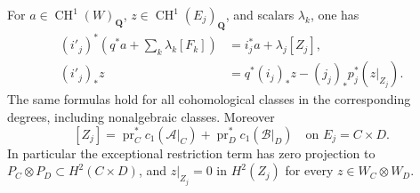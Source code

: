 \begin{lemma}
\label{r22dw:actualmaps}
For $a\in\operatorname{CH}^1(W)_{\mathbf Q}$,
$z\in\operatorname{CH}^1(E_j)_{\mathbf Q}$, and scalars $\lambda_k$,
one has
\[
\begin{aligned}
 (i'_j)^*\left(q^*a+\sum_k\lambda_k[F_k]\right)
       &=i_j^*a+\lambda_j[Z_j],\\
 (i'_j)_*z&=q^*(i_j)_*z-(j_j)_*p_j^*(z|_{Z_j}).
\end{aligned}
 \tag{DW22.4}\label{r22dw:Chowmaps}
\]
The same formulas hold for all cohomological classes in the
corresponding degrees, including nonalgebraic classes.  Moreover
\[
 [Z_j]=\operatorname{pr}_C^*c_1(\mathcal A|_C)
                   +\operatorname{pr}_D^*c_1(\mathcal B|_D)
                         \quad\text{on }E_j=C\times D.
 \tag{DW22.5}\label{r22dw:external}
\]
In particular the exceptional restriction term has zero projection
to $P_C\otimes P_D\subset H^2(C\times D)$, and
$z|_{Z_j}=0$ in $H^2(Z_j)$ for every
$z\in W_C\otimes W_D$.
\end{lemma}

